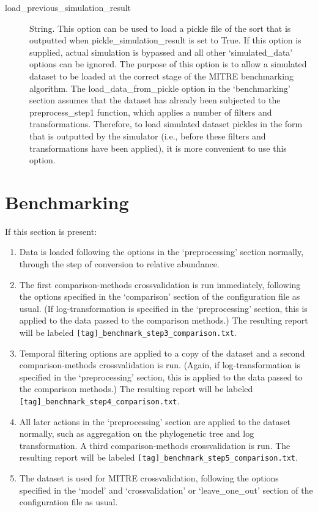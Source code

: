 \documentclass[12pt]{report}
\begin{document}
\begin{description}
  \item[load\_previous\_simulation\_result] String. This option can be used to load a pickle file of the sort that is outputted when pickle\_simulation\_result is set to True. If this option is supplied, actual simulation is bypassed and all other `simulated\_data' options can be ignored. The purpose of this option is to allow a simulated dataset to be loaded at the correct stage of the MITRE benchmarking algorithm. The load\_data\_from\_pickle option in the `benchmarking' section assumes that the dataset has already been subjected to the preprocess\_step1 function, which applies a number of filters and transformations. Therefore, to load simulated dataset pickles in the form that is outputted by the simulator (i.e., before these filters and transformations have been applied), it is more convenient to use this option.
\end{description}

\section{Benchmarking}\label{benchmarking}
If this section is present:
\begin{enumerate}
\item Data is loaded following the options in the `preprocessing' section
    normally, through the step of conversion to relative abundance.

\item The first comparison-methods crossvalidation is run immediately,
  following the options specified in the `comparison' section of the
  configuration file as usual. (If log-transformation is specified in
  the `preprocessing' section, this is applied to the data passed to the
  comparison methods.) The resulting report will be labeled
  \texttt{[tag]\_benchmark\_step3\_comparison.txt}.

\item Temporal filtering options are applied to a copy of the dataset
  and a second comparison-methods crossvalidation is run. (Again, if
  log-transformation is specified in the `preprocessing' section, this
  is applied to the data passed to the comparison methods.)  The
  resulting report will be labeled
  \texttt{[tag]\_benchmark\_step4\_comparison.txt}.

\item All later actions in the `preprocessing' section are applied to
  the dataset normally, such as aggregation on the phylogenetic tree
  and log transformation. A third comparison-methods crossvalidation
  is run. The resulting report will be labeled
  \texttt{[tag]\_benchmark\_step5\_comparison.txt}.

\item The dataset is used for MITRE crossvalidation, following the
  options specified in the `model' and `crossvalidation' or
  `leave\_one\_out' section of the configuration file as usual.
\end{enumerate}
\end{document}

